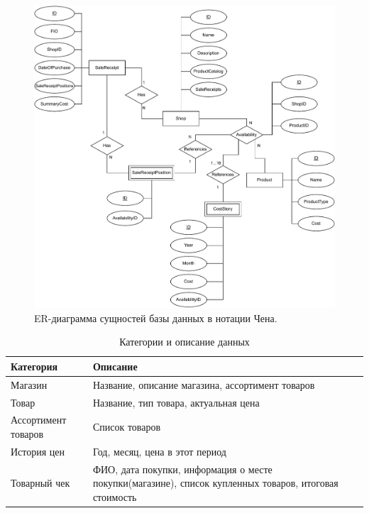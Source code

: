 \documentclass[a4paper,14pt]{extreport}
\begin{document}
\begin{figure}[H]
	\centering
	\includegraphics[scale=0.8]{ER.drawio.pdf}
	\caption{ER-диаграмма сущностей базы данных в нотации Чена.}
	\label{db_proj}
\end{figure}

\captionsetup[table]{skip=-12pt}
\captionsetup{singlelinecheck = false, justification=raggedright}
\begin{table}[H]
	\caption{Категории и описание данных}
	\begin{center}
		\begin{tabular}{| l | p{11 cm} |} 
			\hline
			
			\textbf{Категория} & \textbf{Описание} \\  
			
			\hline
			
			Магазин & Название, описание магазина, ассортимент товаров \\
			
			\hline
			
			Товар & Название, тип товара, актуальная цена \\
			
			\hline
			
			Ассортимент товаров & Список товаров \\
			
			\hline
			
			История цен & Год, месяц, цена в этот период \\
			
			\hline
			
			Товарный чек & ФИО, дата покупки, информация о месте покупки(магазине), список купленных товаров, итоговая стоимость \\
			\hline
		\end{tabular}
	\end{center}
\end{table}
\end{document}
